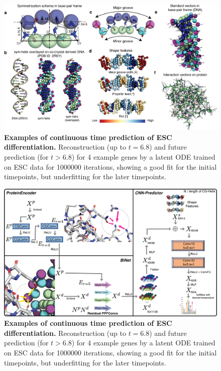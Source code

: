 \begin{center}
\begin{figure}[H]
  \includegraphics[width=\linewidth]{./pdnafigs/figS2.png}
    \caption[Examples of continuous time prediction of ESC differentiation.]{\textbf{Examples of continuous time prediction of ESC differentiation.} Reconstruction (up to $t=6.8$) and future prediction (for $t>6.8$) for 4 example genes by a  latent ODE \citep{chen2018neural} trained on ESC data \citep{Klein2015} for 1000000 iterations, showing a good fit for the initial timepoints, but underfitting for the later timepoints.}
  \label{fig:pdnaS2}
\end{figure}
\end{center}

\begin{center}
\begin{figure}[H]
  \includegraphics[width=\linewidth]{./pdnafigs/figS3.png}
    \caption[Examples of continuous time prediction of ESC differentiation.]{\textbf{Examples of continuous time prediction of ESC differentiation.} Reconstruction (up to $t=6.8$) and future prediction (for $t>6.8$) for 4 example genes by a  latent ODE \citep{chen2018neural} trained on ESC data \citep{Klein2015} for 1000000 iterations, showing a good fit for the initial timepoints, but underfitting for the later timepoints.}
  \label{fig:pdnaS3}
\end{figure}
\end{center}

